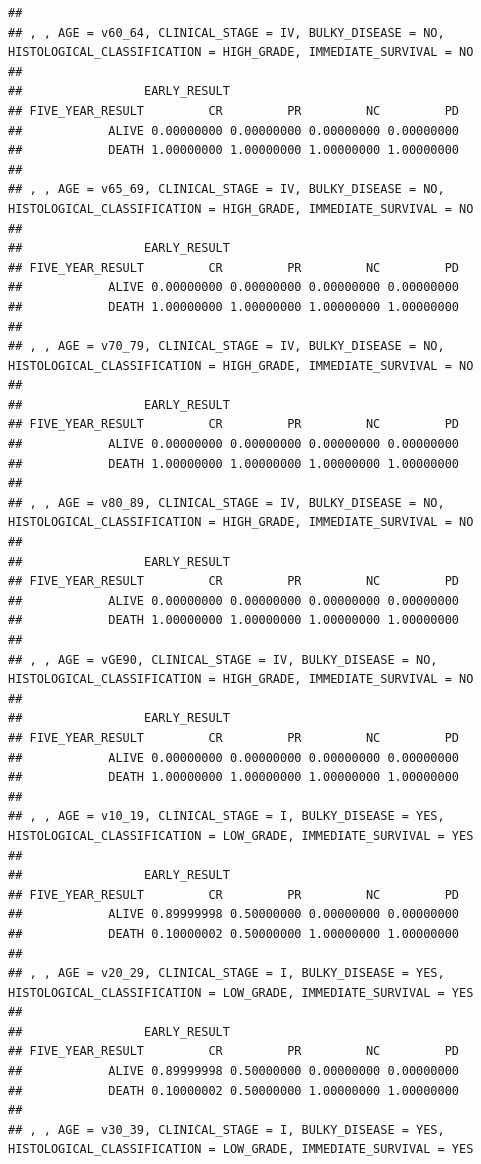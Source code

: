 \documentclass[]{article}
\begin{document}
\begin{verbatim}
## 
## , , AGE = v60_64, CLINICAL_STAGE = IV, BULKY_DISEASE = NO, HISTOLOGICAL_CLASSIFICATION = HIGH_GRADE, IMMEDIATE_SURVIVAL = NO
## 
##                 EARLY_RESULT
## FIVE_YEAR_RESULT         CR         PR         NC         PD
##            ALIVE 0.00000000 0.00000000 0.00000000 0.00000000
##            DEATH 1.00000000 1.00000000 1.00000000 1.00000000
## 
## , , AGE = v65_69, CLINICAL_STAGE = IV, BULKY_DISEASE = NO, HISTOLOGICAL_CLASSIFICATION = HIGH_GRADE, IMMEDIATE_SURVIVAL = NO
## 
##                 EARLY_RESULT
## FIVE_YEAR_RESULT         CR         PR         NC         PD
##            ALIVE 0.00000000 0.00000000 0.00000000 0.00000000
##            DEATH 1.00000000 1.00000000 1.00000000 1.00000000
## 
## , , AGE = v70_79, CLINICAL_STAGE = IV, BULKY_DISEASE = NO, HISTOLOGICAL_CLASSIFICATION = HIGH_GRADE, IMMEDIATE_SURVIVAL = NO
## 
##                 EARLY_RESULT
## FIVE_YEAR_RESULT         CR         PR         NC         PD
##            ALIVE 0.00000000 0.00000000 0.00000000 0.00000000
##            DEATH 1.00000000 1.00000000 1.00000000 1.00000000
## 
## , , AGE = v80_89, CLINICAL_STAGE = IV, BULKY_DISEASE = NO, HISTOLOGICAL_CLASSIFICATION = HIGH_GRADE, IMMEDIATE_SURVIVAL = NO
## 
##                 EARLY_RESULT
## FIVE_YEAR_RESULT         CR         PR         NC         PD
##            ALIVE 0.00000000 0.00000000 0.00000000 0.00000000
##            DEATH 1.00000000 1.00000000 1.00000000 1.00000000
## 
## , , AGE = vGE90, CLINICAL_STAGE = IV, BULKY_DISEASE = NO, HISTOLOGICAL_CLASSIFICATION = HIGH_GRADE, IMMEDIATE_SURVIVAL = NO
## 
##                 EARLY_RESULT
## FIVE_YEAR_RESULT         CR         PR         NC         PD
##            ALIVE 0.00000000 0.00000000 0.00000000 0.00000000
##            DEATH 1.00000000 1.00000000 1.00000000 1.00000000
## 
## , , AGE = v10_19, CLINICAL_STAGE = I, BULKY_DISEASE = YES, HISTOLOGICAL_CLASSIFICATION = LOW_GRADE, IMMEDIATE_SURVIVAL = YES
## 
##                 EARLY_RESULT
## FIVE_YEAR_RESULT         CR         PR         NC         PD
##            ALIVE 0.89999998 0.50000000 0.00000000 0.00000000
##            DEATH 0.10000002 0.50000000 1.00000000 1.00000000
## 
## , , AGE = v20_29, CLINICAL_STAGE = I, BULKY_DISEASE = YES, HISTOLOGICAL_CLASSIFICATION = LOW_GRADE, IMMEDIATE_SURVIVAL = YES
## 
##                 EARLY_RESULT
## FIVE_YEAR_RESULT         CR         PR         NC         PD
##            ALIVE 0.89999998 0.50000000 0.00000000 0.00000000
##            DEATH 0.10000002 0.50000000 1.00000000 1.00000000
## 
## , , AGE = v30_39, CLINICAL_STAGE = I, BULKY_DISEASE = YES, HISTOLOGICAL_CLASSIFICATION = LOW_GRADE, IMMEDIATE_SURVIVAL = YES

\end{verbatim}
\end{document}
